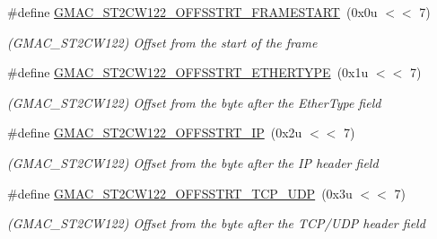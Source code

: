 \begin{DoxyCompactItemize}
\item 
\mbox{\label{group__SAME70__GMAC_gaa2759a23ab3233270061854d197d088d}} 
\#define \mbox{\hyperlink{group__SAME70__GMAC_gaa2759a23ab3233270061854d197d088d}{G\+M\+A\+C\+\_\+\+S\+T2\+C\+W122\+\_\+\+O\+F\+F\+S\+S\+T\+R\+T\+\_\+\+F\+R\+A\+M\+E\+S\+T\+A\+RT}}~(0x0u $<$$<$ 7)
\begin{DoxyCompactList}\small\item\em (G\+M\+A\+C\+\_\+\+S\+T2\+C\+W122) Offset from the start of the frame \end{DoxyCompactList}\item 
\mbox{\label{group__SAME70__GMAC_ga8b058df32dc9de84a9ab2423cc98160a}} 
\#define \mbox{\hyperlink{group__SAME70__GMAC_ga8b058df32dc9de84a9ab2423cc98160a}{G\+M\+A\+C\+\_\+\+S\+T2\+C\+W122\+\_\+\+O\+F\+F\+S\+S\+T\+R\+T\+\_\+\+E\+T\+H\+E\+R\+T\+Y\+PE}}~(0x1u $<$$<$ 7)
\begin{DoxyCompactList}\small\item\em (G\+M\+A\+C\+\_\+\+S\+T2\+C\+W122) Offset from the byte after the Ether\+Type field \end{DoxyCompactList}\item 
\mbox{\label{group__SAME70__GMAC_ga89415615cded93182ca4c0b963913697}} 
\#define \mbox{\hyperlink{group__SAME70__GMAC_ga89415615cded93182ca4c0b963913697}{G\+M\+A\+C\+\_\+\+S\+T2\+C\+W122\+\_\+\+O\+F\+F\+S\+S\+T\+R\+T\+\_\+\+IP}}~(0x2u $<$$<$ 7)
\begin{DoxyCompactList}\small\item\em (G\+M\+A\+C\+\_\+\+S\+T2\+C\+W122) Offset from the byte after the IP header field \end{DoxyCompactList}\item 
\mbox{\label{group__SAME70__GMAC_gae199f62001eca1a062c7879756aba16a}} 
\#define \mbox{\hyperlink{group__SAME70__GMAC_gae199f62001eca1a062c7879756aba16a}{G\+M\+A\+C\+\_\+\+S\+T2\+C\+W122\+\_\+\+O\+F\+F\+S\+S\+T\+R\+T\+\_\+\+T\+C\+P\+\_\+\+U\+DP}}~(0x3u $<$$<$ 7)
\begin{DoxyCompactList}\small\item\em (G\+M\+A\+C\+\_\+\+S\+T2\+C\+W122) Offset from the byte after the T\+C\+P/\+U\+DP header field \end{DoxyCompactList}\item 
\mbox{\label{group__SAME70__GMAC_gaf2f6ed618e4d9b91654ebd95e17af1bb}} 

\end{DoxyCompactItemize}
